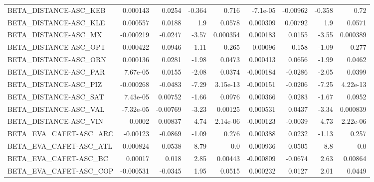 \begin{tabular}{lrrrrrrrr}
BETA\_DISTANCE-ASC\_KEB                  &    0.000143 &       0.0254 &  -0.364 &    0.716 &   -7.1e-05 &    -0.00962 &       -0.358 &          0.72 \\
BETA\_DISTANCE-ASC\_KLE                  &    0.000557 &       0.0188 &     1.9 &   0.0578 &   0.000309 &     0.00792 &          1.9 &        0.0571 \\
BETA\_DISTANCE-ASC\_MX                   &   -0.000219 &      -0.0247 &   -3.57 & 0.000354 &   0.000183 &      0.0155 &        -3.55 &      0.000389 \\
BETA\_DISTANCE-ASC\_OPT                  &    0.000422 &       0.0946 &   -1.11 &    0.265 &    0.00096 &       0.158 &        -1.09 &         0.277 \\
BETA\_DISTANCE-ASC\_ORN                  &    0.000136 &       0.0281 &   -1.98 &   0.0473 &   0.000413 &      0.0656 &        -1.99 &        0.0462 \\
BETA\_DISTANCE-ASC\_PAR                  &    7.67e-05 &       0.0155 &   -2.08 &   0.0374 &  -0.000184 &     -0.0286 &        -2.05 &        0.0399 \\
BETA\_DISTANCE-ASC\_PIZ                  &   -0.000268 &      -0.0483 &   -7.29 & 3.15e-13 &  -0.000151 &     -0.0206 &        -7.25 &      4.22e-13 \\
BETA\_DISTANCE-ASC\_SAT                  &    7.43e-05 &      0.00752 &   -1.66 &   0.0976 &   0.000366 &      0.0283 &        -1.67 &        0.0952 \\
BETA\_DISTANCE-ASC\_VAL                  &   -7.32e-05 &     -0.00769 &   -3.23 &  0.00125 &   0.000531 &      0.0437 &        -3.34 &      0.000839 \\
BETA\_DISTANCE-ASC\_VIN                  &      0.0002 &      0.00837 &    4.74 & 2.14e-06 &  -0.000123 &     -0.0039 &         4.73 &      2.22e-06 \\
BETA\_EVA\_CAFET-ASC\_ARC                 &    -0.00123 &      -0.0869 &   -1.09 &    0.276 &   0.000388 &      0.0232 &        -1.13 &         0.257 \\
BETA\_EVA\_CAFET-ASC\_ATL                 &    0.000824 &       0.0538 &    8.79 &      0.0 &   0.000936 &      0.0505 &          8.8 &           0.0 \\
BETA\_EVA\_CAFET-ASC\_BC                  &     0.00017 &        0.018 &    2.85 &  0.00443 &  -0.000809 &     -0.0674 &         2.63 &       0.00864 \\
BETA\_EVA\_CAFET-ASC\_COP                 &   -0.000531 &      -0.0345 &    1.95 &   0.0515 &   0.000232 &      0.0127 &         2.01 &        0.0449 \\

\end{tabular}
